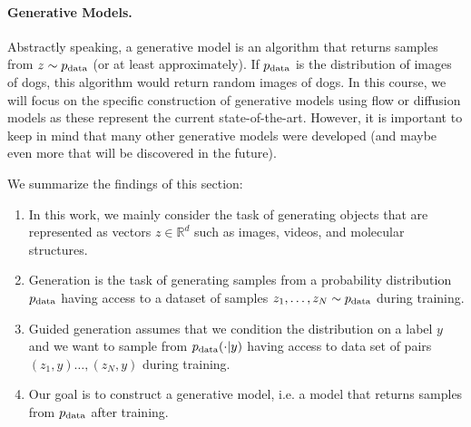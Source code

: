 \paragraph{Generative Models.} Abstractly speaking, a generative model is an algorithm that returns samples from $z\sim p_{\rm{data}}$ (or at least approximately). If $p_{\rm{data}}$ is the distribution of images of dogs, this algorithm would return random images of dogs. In this course, we will focus on the specific construction of generative models using flow or diffusion models as these represent the current state-of-the-art. However, it is important to keep in mind that many other generative models were developed (and maybe even more that will be discovered in the future).

\begin{summarybox} 
\label{par:summary}
We 
summarize the findings of this section:
\begin{enumerate}
\item In this work, we mainly consider the task of generating objects that are represented as vectors $z\in\mathbb{R}^d$ such as images, videos, and molecular structures.
\item Generation is the task of generating samples from a probability distribution $p_{\rm{data}}$ having access to a dataset of samples $z_1,\dots,z_N\sim p_{\rm{data}}$ during training. 
\item Guided generation assumes that we condition the distribution on a label $y$ and we want to sample from $p_{\rm{data}}(\cdot|y)$ having access to data set of pairs $(z_1,y)\dots,(z_N,y)$ during training.
\item Our goal is to construct a generative model, i.e. a model that returns samples from $p_{\rm{data}}$ after training.
\end{enumerate}
\end{summarybox}

